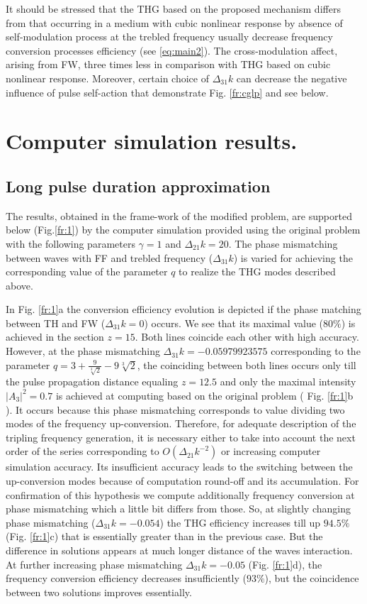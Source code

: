 \documentclass[a4paper, 12pt, onecolumn]{extarticle}
\begin{document}
It should be stressed that the THG based on the proposed mechanism differs from that occurring  in a medium with cubic nonlinear response by absence of  self-modulation process at the trebled frequency  usually decrease frequency conversion processes efficiency (see \eqref{eq:main2}). The cross-modulation affect, arising from FW, three times less in comparison with THG based on cubic nonlinear response. Moreover, certain choice of $\Delta_{31}k$ can decrease the negative influence of pulse self-action  that demonstrate Fig. \ref{fr:cglp} and see below. 

\section*{Computer simulation results.}

\subsection*{Long pulse duration approximation}

The results, obtained in the frame-work of  the modified problem, are supported below (Fig.\ref{fr:1}) by the computer simulation provided using the original problem with the following parameters $\gamma=1$ and $\Delta_{21}k=20$. The phase mismatching between waves with FF and trebled frequency ($\Delta_{31}k$) is varied for achieving the corresponding value of the parameter $q$ to realize the THG modes described above. 

In Fig. \ref{fr:1}a the conversion efficiency evolution is depicted if the phase matching between TH and FW ($\Delta_{31}k=0$) occurs. We see that its maximal value ($80\%$) is achieved  in the section $z=15$. Both lines coincide each other with high accuracy.  However, at the phase mismatching $\Delta_{31}k=-0.05979923575$ corresponding to the parameter $q=3+ \frac{9}{\sqrt[3]{2}}-9\sqrt[3]{2}$, the coinciding between both lines occurs only till the pulse propagation distance equaling $z=12.5$ and only the maximal intensity $|A_3|^2=0.7$ is achieved at computing based on the original problem ( Fig. \ref{fr:1}b ). It occurs because this phase mismatching corresponds to value dividing two modes of the frequency up-conversion.  Therefore, for adequate description of the tripling frequency generation, it is necessary either to take into account the next order of the series corresponding to $O (\Delta_{21}k^{-2}) $ or increasing computer simulation accuracy. Its insufficient accuracy leads to the switching between the up-conversion modes because of computation round-off and its accumulation. For confirmation of this hypothesis we compute additionally frequency conversion at phase mismatching which a little bit differs from those. So, at  slightly changing phase mismatching  ($\Delta_{31}k=-0.054$) the THG efficiency increases till up  $94.5\%$ (Fig. \ref{fr:1}c) that is essentially greater than in the previous case. But the difference in solutions appears at much longer distance of the  waves interaction. At further increasing phase mismatching  $\Delta_{31}k=-0.05$ (Fig. \ref{fr:1}d), the frequency conversion efficiency decreases insufficiently ($93\%$), but the coincidence between two solutions improves essentially.
\end{document}

